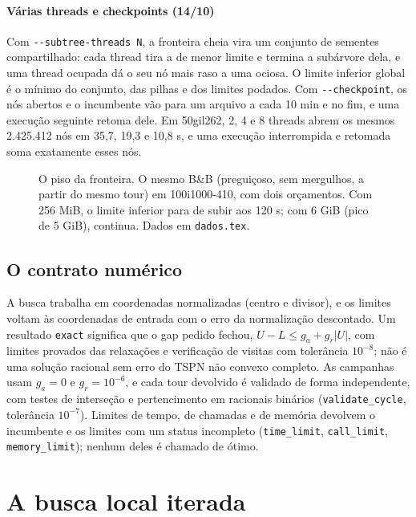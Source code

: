 \documentclass[11pt,a4paper]{article}
\theoremstyle{plain}\newtheorem{proposicao}{Proposição}
\theoremstyle{definition}\newtheorem{definicao}{Definição}
\theoremstyle{plain}\newtheorem{teorema}{Teorema}
\theoremstyle{plain}\newtheorem{lema}{Lema}
\newcommand{\abs}[1]{\lvert#1\rvert}
\newcommand{\code}[1]{\texttt{\small #1}}
\begin{document}
\paragraph{Várias threads e checkpoints (14/10)} Com \code{-{}-subtree-threads N}, a fronteira cheia vira um conjunto de sementes compartilhado: cada thread tira a de menor limite e termina a subárvore dela, e uma thread ocupada dá o seu nó mais raso a uma ociosa. O limite inferior global é o mínimo do conjunto, das pilhas e dos limites podados. Com \code{-{}-checkpoint}, os nós abertos e o incumbente vão para um arquivo a cada 10 min e no fim, e uma execução seguinte retoma dele. Em 50gil262, 2, 4 e 8 threads abrem os mesmos 2.425.412 nós em 35,7, 19,3 e 10,8 s, e uma execução interrompida e retomada soma exatamente esses nós.

\begin{figure}[ht]\centering\figpiso
\caption{O piso da fronteira. O mesmo B\&B (preguiçoso, sem mergulhos, a partir do mesmo tour) em 100i1000-410, com dois orçamentos. Com 256 MiB, o limite inferior para de subir aos 120 s; com 6 GiB (pico de 5 GiB), continua. Dados em \code{dados.tex}.}\label{fig:piso}
\end{figure}

\subsection{O contrato numérico}
A busca trabalha em coordenadas normalizadas (centro e divisor), e os limites voltam às coordenadas de entrada com o erro da normalização descontado. Um resultado \code{exact} significa que o gap pedido fechou, \(U-L\le g_a+g_r\abs U\), com limites provados das relaxações e verificação de visitas com tolerância \(10^{-8}\); não é uma solução racional sem erro do TSPN não convexo completo. As campanhas usam \(g_a=0\) e \(g_r=10^{-6}\), e cada tour devolvido é validado de forma independente, com testes de interseção e pertencimento em racionais binários (\code{validate\_cycle}, tolerância \(10^{-7}\)). Limites de tempo, de chamadas e de memória devolvem o incumbente e os limites com um status incompleto (\code{time\_limit}, \code{call\_limit}, \code{memory\_limit}); nenhum deles é chamado de ótimo.

\section{A busca local iterada}\label{sec:ils}
\end{document}
